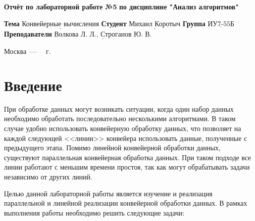 \documentclass[12pt]{report}
\begin{document}
\begin{titlepage}
	
	\begin{center}
		\noindent\begin{minipage}{1.3\textwidth}\centering
			\Large\textbf{  Отчёт по лабораторной работе №5}\newline
			\textbf{по дисциплине "Анализ алгоритмов"}\newline\newline
		\end{minipage}
	\end{center}
	
	\noindent\textbf{Тема} $\underline{\text{Конвейерные вычисления}}$\newline\newline
	\noindent\textbf{Студент} $\underline{\text{Михаил Коротыч}}$\newline\newline
	\noindent\textbf{Группа} $\underline{\text{ИУ7-55Б}}$\newline\newline
	\noindent\textbf{Преподаватели} $\underline{\text{Волкова Л. Л., Строганов Ю. В.}}$\newline\newline\newline
	
	\begin{center}
		\vfill
		Москва~---~\the\year
		~г.
	\end{center}
\end{titlepage}

\tableofcontents

\newpage
\chapter*{Введение}

При обработке данных могут возникать ситуации, когда один набор данных необходимо обработать последовательно несколькими алгоритмами. В таком случае удобно использовать конвейерную обработку данных, что позволяет на каждой следующей <<линии>> конвейера использовать данные, полученные с предыдущего этапа. 
Помимо линейной конвейерной обработки данных, существуют параллельная конвейерная обработка данных. При таком подходе все линии работают с меньшим времени простоя, так как могут обрабатывать задачи независимо от других линий.

Целью данной лабораторной работы является изучение и реализация параллельной и линейной реализации конвейерной обработки данных. В рамках выполнения работы необходимо решить следующие задачи:
\end{document}
